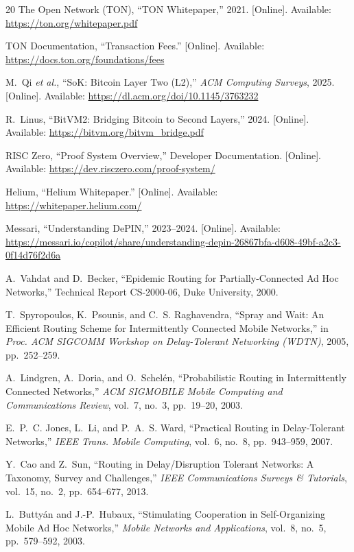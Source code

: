 \documentclass[11pt,a4paper]{article}
\begin{document}
\begin{thebibliography}{20}
The Open Network (TON), ``TON Whitepaper,'' 2021. [Online]. Available: \url{https://ton.org/whitepaper.pdf}

TON Documentation, ``Transaction Fees.'' [Online]. Available: \url{https://docs.ton.org/foundations/fees}

M.~Qi \textit{et al.}, ``SoK: Bitcoin Layer Two (L2),'' \textit{ACM Computing Surveys}, 2025. [Online]. Available: \url{https://dl.acm.org/doi/10.1145/3763232}

R.~Linus, ``BitVM2: Bridging Bitcoin to Second Layers,'' 2024. [Online]. Available: \url{https://bitvm.org/bitvm_bridge.pdf}

RISC Zero, ``Proof System Overview,'' Developer Documentation. [Online]. Available: \url{https://dev.risczero.com/proof-system/}

Helium, ``Helium Whitepaper.'' [Online]. Available: \url{https://whitepaper.helium.com/}

Messari, ``Understanding DePIN,'' 2023--2024. [Online]. Available: \url{https://messari.io/copilot/share/understanding-depin-26867bfa-d608-49bf-a2c3-0f14d76f2d6a}

A.~Vahdat and D.~Becker, ``Epidemic Routing for Partially-Connected Ad Hoc Networks,'' Technical Report CS-2000-06, Duke University, 2000.

T.~Spyropoulos, K.~Psounis, and C.~S. Raghavendra, ``Spray and Wait: An Efficient Routing Scheme for Intermittently Connected Mobile Networks,'' in \textit{Proc. ACM SIGCOMM Workshop on Delay-Tolerant Networking (WDTN)}, 2005, pp.~252--259.

A.~Lindgren, A.~Doria, and O.~Schel\'{e}n, ``Probabilistic Routing in Intermittently Connected Networks,'' \textit{ACM SIGMOBILE Mobile Computing and Communications Review}, vol.~7, no.~3, pp.~19--20, 2003.

E.~P.~C. Jones, L.~Li, and P.~A.~S. Ward, ``Practical Routing in Delay-Tolerant Networks,'' \textit{IEEE Trans. Mobile Computing}, vol.~6, no.~8, pp.~943--959, 2007.

Y.~Cao and Z.~Sun, ``Routing in Delay/Disruption Tolerant Networks: A Taxonomy, Survey and Challenges,'' \textit{IEEE Communications Surveys \& Tutorials}, vol.~15, no.~2, pp.~654--677, 2013.

L.~Butty\'{a}n and J.-P.~Hubaux, ``Stimulating Cooperation in Self-Organizing Mobile Ad Hoc Networks,'' \textit{Mobile Networks and Applications}, vol.~8, no.~5, pp.~579--592, 2003.


\end{thebibliography}
\end{document}
